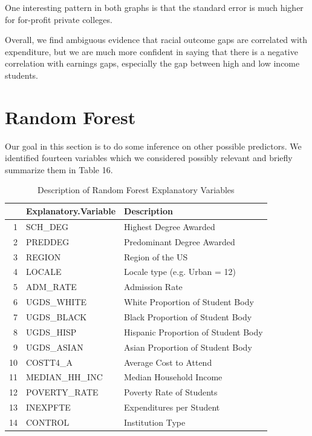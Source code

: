 \documentclass{article}
\begin{document}
One interesting pattern in both graphs is that the standard error is much higher for for-profit private colleges.

Overall, we find ambiguous evidence that racial outcome gaps are correlated with expenditure, but we are much more confident in saying that there is a negative correlation with earnings gaps, especially the gap between high and low income students.



\newpage


\newpage
\section{Random Forest}

Our goal in this section is to do some inference on other possible predictors. We identified fourteen variables which we considered possibly relevant and briefly summarize them in Table 16.
  

 
\begin{table}[ht]
\centering
\caption{Description of Random Forest Explanatory Variables} 
\begin{tabular}{rll}
  \hline
 & Explanatory.Variable & Description \\ 
  \hline
1 & SCH\_DEG & Highest Degree Awarded \\ 
  2 & PREDDEG & Predominant Degree Awarded \\ 
  3 & REGION & Region of the US \\ 
  4 & LOCALE & Locale type (e.g. Urban = 12) \\ 
  5 & ADM\_RATE & Admission Rate \\ 
  6 & UGDS\_WHITE & White Proportion of Student Body \\ 
  7 & UGDS\_BLACK & Black Proportion of Student Body \\ 
  8 & UGDS\_HISP & Hispanic Proportion of Student Body \\ 
  9 & UGDS\_ASIAN & Asian Proportion of Student Body \\ 
  10 & COSTT4\_A & Average Cost to Attend \\ 
  11 & MEDIAN\_HH\_INC & Median Household Income \\ 
  12 & POVERTY\_RATE & Poverty Rate of Students \\ 
  13 & INEXPFTE & Expenditures per Student \\ 
  14 & CONTROL & Institution Type \\ 
   \hline
\end{tabular}
\end{table}
\end{document}
